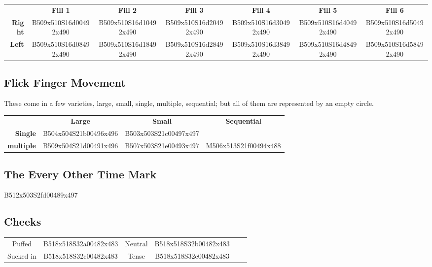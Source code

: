 \documentclass{article}
\begin{document}
\begin{center}
\begin{tabular}{r*{6}{c}}
&\textbf{Fill 1}&\textbf{Fill 2}&\textbf{Fill 3}&\textbf{Fill 4}&\textbf{Fill 5}&\textbf{Fill 6}\\
\textbf{Right}&
B509x510S16d00492x490&
B509x510S16d10492x490&
B509x510S16d20492x490&
B509x510S16d30492x490&
B509x510S16d40492x490&
B509x510S16d50492x490\\
\textbf{Left}&
B509x510S16d08492x490&
B509x510S16d18492x490&
B509x510S16d28492x490&
B509x510S16d38492x490&
B509x510S16d48492x490&
B509x510S16d58492x490\\
\end{tabular}
\end{center}

\subsection{Flick Finger Movement}

These come in a few varieties, large, small, single, multiple, sequential; but all of them are represented by an empty circle.

\begin{center}
\begin{tabular}{r*{3}{c}}
&\textbf{Large}&\textbf{Small}&\textbf{Sequential}\\
\textbf{Single}  &B504x504S21b00496x496&B503x503S21c00497x497\\
\textbf{multiple}&B509x504S21d00491x496&B507x503S21e00493x497&M506x513S21f00494x488\\
\end{tabular}
\end{center}

\subsection{The Every Other Time Mark}

\begin{center}
B512x503S2fd00489x497
\end{center}

\subsection{Cheeks}

\begin{center}
\begin{tabular}{*{6}{c}}
Puffed   &B518x518S32a00482x483&Neutral&B518x518S32b00482x483\\
Sucked in&B518x518S32c00482x483&Tense  &B518x518S32e00482x483\\
\end{tabular}
\end{center}
\end{document}
